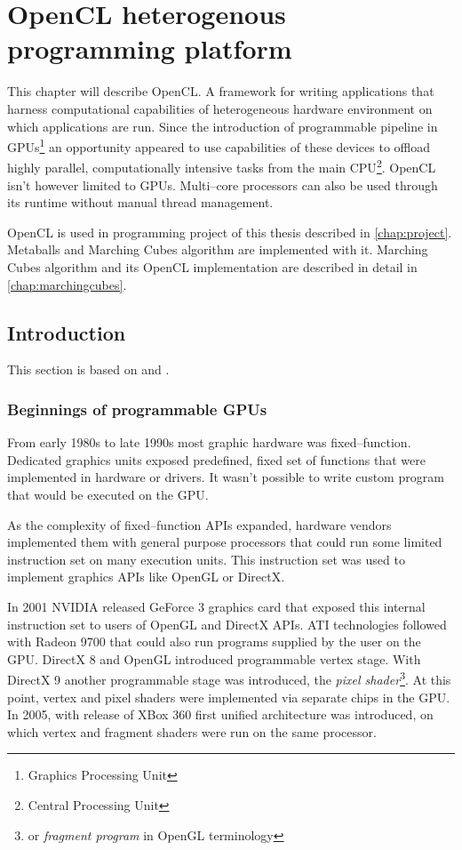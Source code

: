 \chapter{OpenCL heterogenous programming platform}
This chapter will describe OpenCL. A framework for writing applications that
harness computational capabilities of heterogeneous hardware environment on
which applications are run. Since the introduction of programmable pipeline
in GPUs\footnote{Graphics Processing Unit} an opportunity appeared to use
capabilities of these devices to offload highly parallel, computationally
intensive tasks from the main CPU\footnote{Central Processing Unit}. OpenCL
isn't however limited to GPUs. Multi--core processors can also be used through
its runtime without manual thread management.

OpenCL is used in programming project of this thesis described in \autoref{chap:project}.
Metaballs and Marching Cubes algorithm are implemented with it. Marching Cubes
algorithm and its OpenCL implementation are described in detail in
\autoref{chap:marchingcubes}.

\section{Introduction}
This section is based on \cite{Kirk:2010:PMP:1841511} and
\cite{gaster2012heterogeneous}.

\subsection{Beginnings of programmable GPUs}

From early 1980s to late 1990s most graphic hardware was fixed--function.
Dedicated graphics units exposed predefined, fixed set of functions that were
implemented in hardware or drivers. It wasn't possible to write custom program
that would be executed on the GPU.

As the complexity of fixed--function APIs expanded, hardware vendors implemented
them with general purpose processors that could run some limited instruction set
on many execution units. This instruction set was used to implement graphics APIs
like OpenGL or DirectX.

In 2001 NVIDIA released GeForce 3 graphics card that exposed this internal
instruction set to users of OpenGL and DirectX APIs. ATI technologies followed
with Radeon 9700 that could also run programs supplied by the user on the GPU.
DirectX 8 and OpenGL introduced programmable vertex stage. With
DirectX 9 another programmable stage was introduced, the \emph{pixel shader}\footnote{or \emph{fragment program} in
OpenGL terminology}. At this point, vertex and pixel shaders were
implemented via separate chips in the GPU. In 2005, with release of XBox 360
first unified architecture was introduced, on which vertex and fragment shaders
were run on the same processor.

